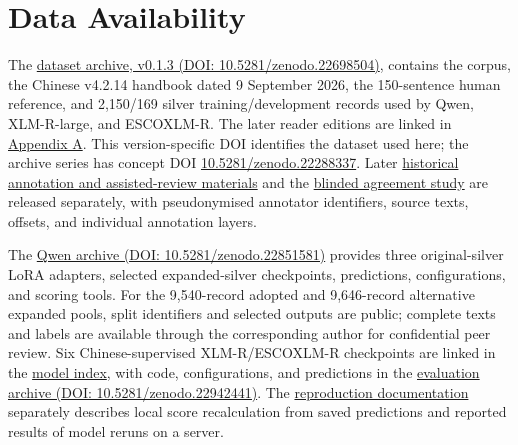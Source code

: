 \documentclass[fleqn,12pt,lineno]{wlpeerj}
\begin{document}
\section{Data Availability}
\begin{sloppypar}
\RaggedRight %
\setlength{\parindent}{1em}
The \href{https://doi.org/10.5281/zenodo.22698504}{dataset archive, v0.1.3 (DOI: 10.5281/zenodo.22698504)}, contains the corpus, the Chinese v4.2.14 handbook dated 9 September 2026, the 150-sentence human reference, and 2,150/169 silver training/development records used by Qwen, XLM-R-large, and ESCOXLM-R. The later reader editions are linked in \hyperref[app:a]{Appendix A}. This version-specific DOI identifies the dataset used here; the archive series has concept DOI \href{https://doi.org/10.5281/zenodo.22288337}{10.5281/zenodo.22288337}. Later \href{https://github.com/AlfredJamesLi/chinese-skillspan-benchmark/blob/main/reproduction/evidence_review_20260925/annotation_layers/README.md}{historical annotation and assisted-review materials} and the \href{https://github.com/AlfredJamesLi/chinese-skillspan-benchmark/tree/main/reproduction/agreement/finalguide_abc_20261003}{blinded agreement study} are released separately, with pseudonymised annotator identifiers, source texts, offsets, and individual annotation layers.

The \href{https://doi.org/10.5281/zenodo.22851581}{Qwen archive (DOI: 10.5281/zenodo.22851581)} provides three original-silver LoRA adapters, selected expanded-silver checkpoints, predictions, configurations, and scoring tools. For the 9,540-record adopted and 9,646-record alternative expanded pools, split identifiers and selected outputs are public; complete texts and labels are available through the corresponding author for confidential peer review. Six Chinese-supervised XLM-R/ESCOXLM-R checkpoints are linked in the \href{https://github.com/AlfredJamesLi/chinese-skillspan-benchmark/blob/0c73207c0f9b00fa87f385b78bcb7342bd00bfcb/results_snapshots/table11_evidence_20260924/HF_RELEASE.md}{model index}, with code, configurations, and predictions in the \href{https://doi.org/10.5281/zenodo.22942441}{evaluation archive (DOI: 10.5281/zenodo.22942441)}. The \href{https://github.com/AlfredJamesLi/chinese-skillspan-benchmark/blob/main/reproduction/evidence_review_20260925/README.md}{reproduction documentation} separately describes local score recalculation from saved predictions and reported results of model reruns on a server.


\end{sloppypar}
\end{document}
